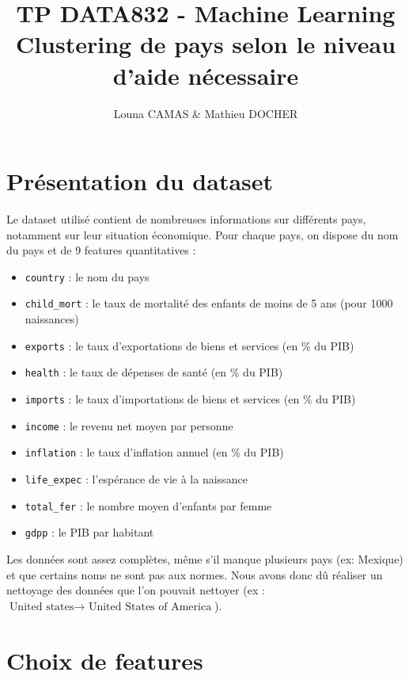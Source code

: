 \documentclass{article}
\title{\textbf{TP DATA832 - Machine Learning} \\Clustering de pays selon le niveau d'aide nécessaire}
\author{Louna CAMAS \& Mathieu DOCHER}
\date{}
\begin{document}
\maketitle

\vspace{3cm}
\tableofcontents

\newpage
{}
\section{Présentation du dataset}

\noindent Le dataset utilisé contient de nombreuses informations sur différents pays, notamment sur leur situation économique. Pour chaque pays, on dispose du nom du pays et de 9 features quantitatives :

\begin{itemize}
    \item \texttt{country} : le nom du pays
    \item \texttt{child\_mort} : le taux de mortalité des enfants de moins de 5 ans (pour 1000 naissances)
    \item \texttt{exports} : le taux d'exportations de biens et services (en \% du PIB)
    \item \texttt{health} : le taux de dépenses de santé (en \% du PIB)
    \item \texttt{imports} : le taux d'importations de biens et services (en \% du PIB)
    \item \texttt{income} : le revenu net moyen par personne
    \item \texttt{inflation} : le taux d'inflation annuel (en \% du PIB)
    \item \texttt{life\_expec} : l'espérance de vie à la naissance
    \item \texttt{total\_fer} : le nombre moyen d'enfants par femme
    \item \texttt{gdpp} : le PIB par habitant
\end{itemize}
Les données sont assez complètes, même s'il manque plusieurs pays (ex: Mexique) et que certains noms ne sont pas aux normes. Nous avons donc dû réaliser un nettoyage des données que l'on pouvait nettoyer (ex : $\text{United states} \rightarrow  \text{ United States of America}$).

\newpage
\section{Choix de features}
\end{document}
